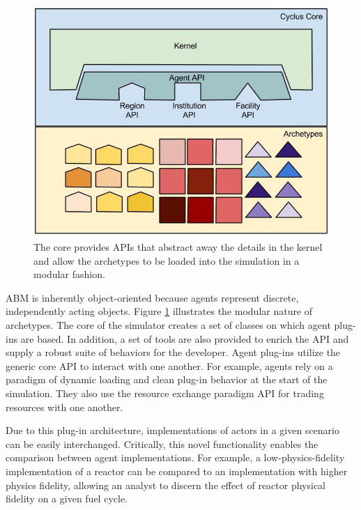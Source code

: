 \begin{figure}[htbp!]
\begin{center}
\includegraphics[width=\textwidth]{./images/framework}
\end{center}
\caption{The \Cyclus core provides \gls{API}s that abstract away the details in 
the kernel and allow the archetypes to be loaded into the simulation in a modular 
fashion.}
\label{fig:framework}
\end{figure}

\gls{ABM} is inherently object-oriented because agents represent 
discrete, independently acting objects.  Figure \ref{fig:framework} illustrates
the modular nature of \Cyclus archetypes.  The core of the \Cyclus simulator 
creates a set of classes on which agent plug-ins 
are based. In addition, a set of tools are also provided to enrich the 
\gls{API} and supply a robust suite of behaviors for the developer. 
Agent plug-ins utilize the generic core \gls{API} to interact with one another.  For 
example, agents rely on a paradigm of dynamic loading and clean plug-in 
behavior at the start of the simulation. They also use the resource exchange 
paradigm \gls{API} for trading resources with one another. 

Due to this plug-in architecture,
implementations of actors in a given scenario can be easily
interchanged. Critically, this novel functionality enables the comparison
between agent implementations. For example, a low-physics-fidelity
implementation of a reactor can be compared to an implementation with higher
physics fidelity, allowing an analyst to discern the effect of reactor physical
fidelity on a given fuel cycle. 

